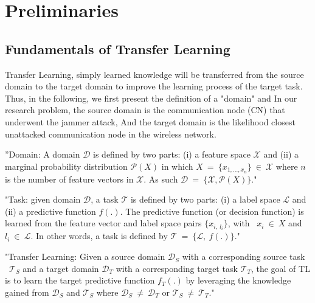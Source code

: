 \documentclass[letterpaper%
, twoside%
, 12pt%
,thesepararticles%
, english%
,creativecommons,hyperref, withAlgo2e%
]{thETS}
\begin{document}
\section{Preliminaries}


\subsection{Fundamentals of Transfer Learning}


Transfer Learning, simply learned knowledge will be transferred from the source domain to the target domain to improve the learning process of the target task. Thus, in the following, we first present the definition of a "domain" and  In our research problem, the source domain is the communication node (CN) that underwent the jammer attack, And the target domain is the likelihood closest unattacked communication node in the wireless network.

\begin{definition}
''Domain: A domain $\displaystyle \mathcal{D}$ is defined by two parts: (i) a feature space $\displaystyle \mathcal{X}$ and (ii) a marginal probability distribution $\displaystyle \mathcal{P}( X)$ in which $\displaystyle X\ =\ \{x_{1,\dotsc ,x_{n}}\} \ \in \ \mathcal{X}$ where $\displaystyle n$ is the number of feature vectors in $\displaystyle \mathcal{X} .$ As such $\displaystyle \mathcal{D} \ =\ \{\mathcal{X} ,\mathcal{P}( X)\}$."
\end{definition}

\begin{definition}
"Task: given domain $\displaystyle \mathcal{D}$, a task $\displaystyle \mathcal{T}$ is defined by two parts: (i) a label space $\displaystyle \mathcal{L}$ and (ii) a predictive function $\displaystyle f( .)$. The predictive function (or decision function) is learned from the feature vector and label space pairs $\displaystyle \{x_{i,\ l_{i}}\}$, with \ $\displaystyle x_{i} \ \in \ X$ and $\displaystyle l_{i} \ \in \ \mathcal{L}$. In other words, a task is defined by $\displaystyle \mathcal{T} \ =\ \{\mathcal{L} ,\ f( .)\}$."
\end{definition}

\begin{definition}
"Transfer Learning: Given a source domain $\displaystyle \mathcal{D}_{S}$ with a corresponding source task \ $\displaystyle \mathcal{T}_{S}$ and a target domain $\displaystyle \mathcal{D}_{T}$ with a corresponding target task $\displaystyle \mathcal{T}_{T}$, the goal of TL is to learn the target predictive function $\displaystyle f_{T}( .)$ by leveraging the knowledge gained from $\displaystyle \mathcal{D}_{S}$ and $\displaystyle \mathcal{T}_{S}$ where $\displaystyle \mathcal{D}_{S} \ \neq \ \mathcal{D}_{T}$ or $\displaystyle \mathcal{T}_{S} \ \neq \ \mathcal{T}_{T}$."
\end{definition}
\end{document}
